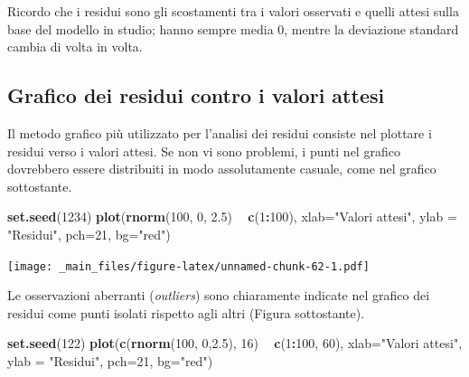 \documentclass[a4paper,12pt,oneside]{book}
\newenvironment{Shaded}{\begin{snugshade}}{\end{snugshade}}
\newcommand{\KeywordTok}[1]{\textcolor[rgb]{0.13,0.29,0.53}{\textbf{#1}}}
\newcommand{\DataTypeTok}[1]{\textcolor[rgb]{0.13,0.29,0.53}{#1}}
\newcommand{\DecValTok}[1]{\textcolor[rgb]{0.00,0.00,0.81}{#1}}
\newcommand{\FloatTok}[1]{\textcolor[rgb]{0.00,0.00,0.81}{#1}}
\newcommand{\StringTok}[1]{\textcolor[rgb]{0.31,0.60,0.02}{#1}}
\newcommand{\OperatorTok}[1]{\textcolor[rgb]{0.81,0.36,0.00}{\textbf{#1}}}
\newcommand{\NormalTok}[1]{#1}
\theoremstyle{definition}
\theoremstyle{definition}
\theoremstyle{definition}
\theoremstyle{remark}
\begin{document}
Ricordo che i residui sono gli scostamenti tra i valori osservati e
quelli attesi sulla base del modello in studio; hanno sempre media 0,
mentre la deviazione standard cambia di volta in volta.

\subsection{Grafico dei residui contro i valori
attesi}\label{grafico-dei-residui-contro-i-valori-attesi}

Il metodo grafico più utilizzato per l'analisi dei residui consiste nel
plottare i residui verso i valori attesi. Se non vi sono problemi, i
punti nel grafico dovrebbero essere distribuiti in modo assolutamente
casuale, come nel grafico sottostante.

\begin{Shaded}
\begin{Highlighting}[]
\KeywordTok{set.seed}\NormalTok{(}\DecValTok{1234}\NormalTok{)}
\KeywordTok{plot}\NormalTok{(}\KeywordTok{rnorm}\NormalTok{(}\DecValTok{100}\NormalTok{, }\DecValTok{0}\NormalTok{, }\FloatTok{2.5}\NormalTok{) }\OperatorTok{~}\StringTok{ }\KeywordTok{c}\NormalTok{(}\DecValTok{1}\OperatorTok{:}\DecValTok{100}\NormalTok{), }\DataTypeTok{xlab=}\StringTok{"Valori attesi"}\NormalTok{, }
     \DataTypeTok{ylab =} \StringTok{"Residui"}\NormalTok{, }\DataTypeTok{pch=}\DecValTok{21}\NormalTok{, }\DataTypeTok{bg=}\StringTok{"red"}\NormalTok{)}
\end{Highlighting}
\end{Shaded}

\texttt{[image: \_main\_files/figure-latex/unnamed-chunk-62-1.pdf]}

Le osservazioni aberranti (\emph{outliers}) sono chiaramente indicate
nel grafico dei residui come punti isolati rispetto agli altri (Figura
sottostante).

\begin{Shaded}
\begin{Highlighting}[]
\KeywordTok{set.seed}\NormalTok{(}\DecValTok{122}\NormalTok{)}
\KeywordTok{plot}\NormalTok{(}\KeywordTok{c}\NormalTok{(}\KeywordTok{rnorm}\NormalTok{(}\DecValTok{100}\NormalTok{, }\DecValTok{0}\NormalTok{,}\FloatTok{2.5}\NormalTok{), }\DecValTok{16}\NormalTok{) }\OperatorTok{~}\StringTok{ }\KeywordTok{c}\NormalTok{(}\DecValTok{1}\OperatorTok{:}\DecValTok{100}\NormalTok{, }\DecValTok{60}\NormalTok{), }\DataTypeTok{xlab=}\StringTok{"Valori attesi"}\NormalTok{, }
     \DataTypeTok{ylab =} \StringTok{"Residui"}\NormalTok{, }\DataTypeTok{pch=}\DecValTok{21}\NormalTok{, }\DataTypeTok{bg=}\StringTok{"red"}\NormalTok{)}
\end{Highlighting}
\end{Shaded}
\end{document}
